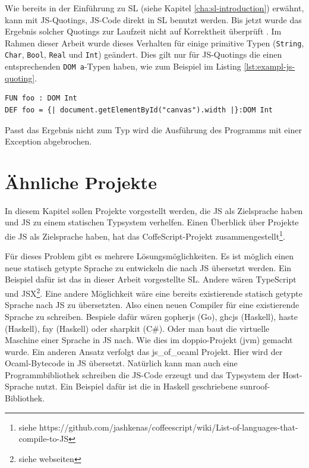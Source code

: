 \documentclass[12pt,bibtotoc]{scrreprt}
\begin{document}
Wie bereits in der Einführung zu SL (siehe Kapitel \ref{cha:sl-introduction}) erwähnt, kann mit JS-Quotings, JS-Code direkt in SL benutzt werden. Bis jetzt wurde das Ergebnis solcher Quotings zur Laufzeit nicht auf Korrektheit überprüft \cite[S. 29]{Bisping2013}. Im Rahmen dieser Arbeit wurde dieses Verhalten für einige primitive Typen (\lstinline!String!, \lstinline!Char!, \lstinline!Bool!, \lstinline!Real! und \lstinline!Int!) geändert. Dies gilt nur für JS-Quotings die einen entsprechenden \lstinline!DOM a!-Typen haben, wie zum Beispiel im Listing \ref{lst:exampl-js-quoting}.

\begin{lstlisting}[caption={Beispiel: JS-Quoting Monade}, label=lst:exampl-js-quoting]
FUN foo : DOM Int
DEF foo = {| document.getElementById("canvas").width |}:DOM Int
\end{lstlisting}

Passt das Ergebnis nicht zum Typ wird die Ausführung des Programms mit einer Exception abgebrochen. 

\chapter{Ähnliche Projekte}
\label{chap:related-works}

In diesem Kapitel sollen Projekte vorgestellt werden, die JS als Zielsprache haben und JS zu einem statischen Typsystem verhelfen. Einen Überblick über Projekte die JS als Zielsprache haben, hat das CoffeScript-Projekt zusammengestellt\footnote{siehe https://github.com/jashkenas/coffeescript/wiki/List-of-languages-that-compile-to-JS}. 

Für dieses Problem gibt es mehrere Lösungsmöglichkeiten. Es ist möglich einen neue statisch getypte Sprache zu entwickeln die nach JS übersetzt werden. Ein Beispiel dafür ist das in dieser Arbeit vorgestellte SL. Andere wären TypeScript und JSX\footnote{siehe webseiten}. Eine andere Möglichkeit wäre eine bereits existierende statisch getypte Sprache nach JS zu übersetzten. Also einen neuen Compiler für eine existierende Sprache zu schreiben. Bespiele dafür wären gopherjs (Go), ghcjs (Haskell), haste (Haskell), fay (Haskell) oder sharpkit (C\#). Oder man baut die virtuelle Maschine einer Sprache in JS nach. Wie dies im doppio-Projekt (jvm) gemacht wurde. Ein anderen Ansatz verfolgt das js\_of\_ocaml Projekt. Hier wird der Ocaml-Bytecode in JS übersetzt. Natürlich kann man auch eine Programmbibliothek schreiben die JS-Code erzeugt und das Typsystem der Host-Sprache nutzt. Ein Beispiel dafür ist die in Haskell geschriebene sunroof-Bibliothek. 
\end{document}
